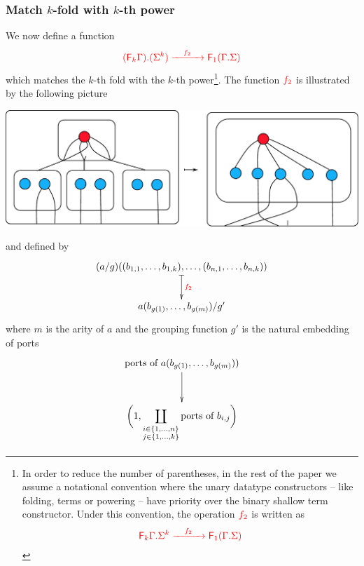 \smallskip

\subsubsection{Match $k$-fold with $k$-th power}
We now define a function 
\begin{align*}
{\color{red}{{\color{red}{({\color{red}{\mathsf F_{k}}}\Gamma) . (\Sigma^k)}} \xrightarrow{\quad f_2\quad} {\color{red}{\mathsf F_{1}}}({\color{red}{\Gamma . \Sigma}})}} 
\end{align*}
which matches the $k$-th fold with the $k$-th power\footnote{In order to reduce the number of parentheses, in  the rest of the paper we assume a notational convention where the unary datatype constructors -- like folding, terms or powering -- have priority over the binary shallow term constructor. Under this convention, the operation ${\color{red}{f_2}}$ is written as 
\begin{align*}
    {\color{red}{{\color{red}{{\color{red}{\mathsf F_{k}}}\Gamma . \Sigma^k}} \xrightarrow{\quad f_2\quad} {\color{red}{\mathsf F_{1}}}({\color{red}{\Gamma . \Sigma}})}} 
    \end{align*}}.
    The function ${\color{red}{f_2}}$ is illustrated by the following  picture
\begin{center}
\includegraphics[scale=.35]{pictures/shallow-unfold}
\end{center}
and  defined by
\begin{eqnarray*}
    \xymatrix{
        (a/g)((b_{1,1},\dots,b_{1,k}),\dots, (b_{n,1},\dots,b_{n,k})) 
        \ar@{|->}[d]^{\ranked{f_2}} \\
         a(b_{g(1)},\dots,b_{g(m)})/g'
    }
\end{eqnarray*}
where $m$ is the arity of $a$ and the grouping function  $g'$ is  the natural embedding of ports 
\begin{align*}
\xymatrix{
    \text{ports of $a(b_{g(1)},\dots,b_{g(m)}))$}
    \ar[d]
    \\
 \displaystyle{\biggl(1, \coprod_{\substack{i \in \set{1,\ldots,n}\\ j \in \set{1,\ldots,k}}} \text{ports of $b_{i,j}$} \biggr)} 
}
\end{align*}
\smallskip


